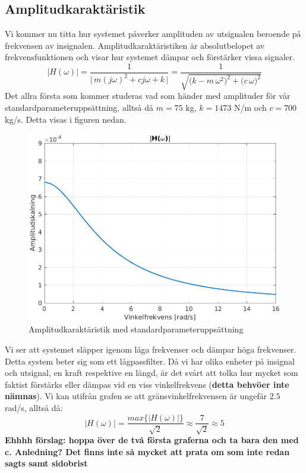 \subsection{Amplitudkaraktäristik}
Vi kommer nu titta hur systemet påverker amplituden av utsignalen beroende på frekvensen av insignalen. Amplitudkaraktäristiken är absolutbelopet av frekvensfunktionen och visar hur systemet dämpar och förstärker vissa signaler. 
$$\big|H(\omega)\big|=\dfrac{1}{\Big|\,m(j\omega)^2+cj\omega+k\,\Big|}=\dfrac{1}{\sqrt{\big(k-m\,\omega^2\big)^2+\big(c\,\omega\big)^2}}$$
Det allra första som kommer studeras vad som händer med amplituder för vår standardparameteruppsättning, alltså då $m=75$ kg, $k=1473$ N/m och $c=700$ kg/s. Detta visas i figuren nedan.
\begin{figure}[H]
    \centering
    \includegraphics[scale=0.9]{bilder/amplitudkaraktaristik}
    \caption{Amplitudkaraktäristik med standardparameteruppsättning}
    \label{fig:amplitudkaraktaristik}
\end{figure}
Vi ser att systemet släpper igenom låga frekvenser och dämpar höga frekvenser. Detta system beter sig som ett lågpassfilter.
Då vi har olika enheter på insignal och utsignal, en kraft respektive en längd, är det svårt att tolka hur mycket som faktist förstärks eller dämpas vid en viss vinkelfrekvens (\textbf{detta behvöer inte nämnas}). Vi kan utifrån grafen se att gränsvinkelfrekvensen är ungefär $2.5$ rad/s, alltså då:
$$\big|H(\omega)\big|=\dfrac{max\Big\{\big|H(\omega)\big|\Big\}}{\sqrt{2}}\approx \frac{7}{\sqrt{2}} \approx 5$$
\newpage
\textbf{Ehhhh förslag: hoppa över de två första graferna och ta bara den med c. Anledning? Det finns inte så mycket att prata om som inte redan sagts samt sidobrist}

